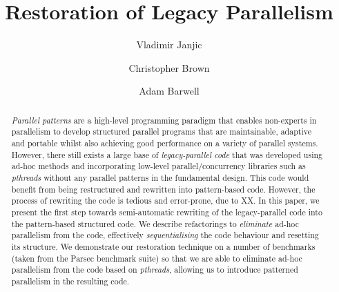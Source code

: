 \documentclass[runningheads]{llncs}
\begin{document}
\title{Restoration of Legacy Parallelism}
%
%
\author{Vladimir Janjic \and
Christopher Brown \and
Adam Barwell}
%
%
%
\maketitle              %
%
\begin{abstract}
    \emph{Parallel patterns} are a high-level programming paradigm that enables non-experts in parallelism to develop structured parallel programs that are maintainable, adaptive and portable whilst also achieving good performance on a variety of parallel systems. However, there still exists a large base of \emph{legacy-parallel code} that was developed using ad-hoc methods and incorporating low-level parallel/concurrency libraries such as \emph{pthreads} without any parallel patterns in the fundamental design. This code would benefit from being restructured and rewritten into pattern-based code. However, the process of rewriting the code is tedious and error-prone, due to XX. In this paper, we present the first step towards semi-automatic rewriting of the legacy-parallel code into the pattern-based structured code. We describe refactorings to \emph{eliminate} ad-hoc parallelism from the code, effectively \emph{sequentialising} the code behaviour and resetting its structure. We demonstrate our restoration technique on a number of benchmarks  (taken from the Parsec benchmark suite) so that we are able to eliminate ad-hoc parallelism from the code based on \emph{pthreads}, allowing us to introduce patterned parallelism in the resulting code.

\end{abstract}

%
%





\end{document}
